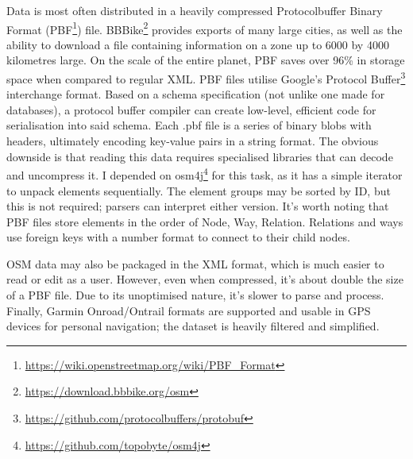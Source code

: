 Data is most often distributed in a heavily compressed Protocolbuffer Binary Format (PBF\footnote{\url{https://wiki.openstreetmap.org/wiki/PBF_Format}}) file. BBBike\footnote{\url{https://download.bbbike.org/osm}} provides exports of many large cities, as well as the ability to download a file containing information on a zone up to 6000 by 4000 kilometres large. On the scale of the entire planet, PBF saves over 96\% in storage space when compared to regular XML. PBF files utilise Google's Protocol Buffer\footnote{\url{https://github.com/protocolbuffers/protobuf}} interchange format. Based on a schema specification (not unlike one made for databases), a protocol buffer compiler can create low-level, efficient code for serialisation into said schema. Each .pbf file is a series of binary blobs with headers, ultimately encoding key-value pairs in a string format. The obvious downside is that reading this data requires specialised libraries that can decode and uncompress it. I depended on osm4j\footnote{\url{https://github.com/topobyte/osm4j}} for this task, as it has a simple iterator to unpack elements sequentially. The element groups may be sorted by ID, but this is not required; parsers can interpret either version.
It's worth noting that PBF files store elements in the order of Node, Way, Relation. Relations and ways use foreign keys with a number format to connect to their child nodes.

OSM data may also be packaged in the XML format, which is much easier to read or edit as a user. However, even when compressed, it's about double the size of a PBF file. Due to its unoptimised nature, it's slower to parse and process. Finally, Garmin Onroad/Ontrail formats are supported and usable in GPS devices for personal navigation; the dataset is heavily filtered and simplified.